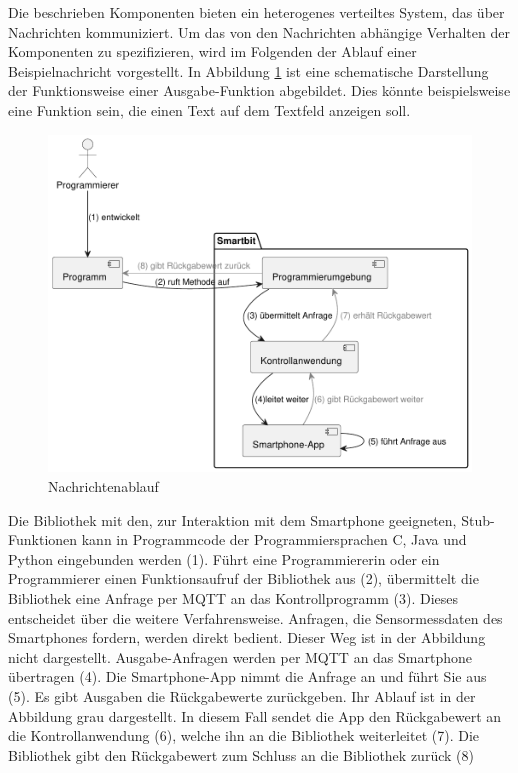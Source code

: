 \documentclass[11pt,a4paper]{report}
\begin{document}
Die beschrieben Komponenten bieten ein heterogenes verteiltes System, das über Nachrichten kommuniziert.
Um das von den Nachrichten abhängige Verhalten der Komponenten zu spezifizieren, wird im Folgenden der Ablauf einer Beispielnachricht vorgestellt.
In Abbildung \ref{fig:arch_flow} ist eine schematische Darstellung der Funktionsweise einer Ausgabe-Funktion abgebildet.
Dies könnte beispielsweise eine Funktion sein, die einen Text auf dem Textfeld anzeigen soll.
\begin{figure}[htbp]
  \centering
  \includegraphics[width=\textwidth]{images/arch_call_flow.pdf}
  \caption{Nachrichtenablauf}
  \label{fig:arch_flow}
\end{figure}
Die Bibliothek mit den, zur Interaktion mit dem Smartphone geeigneten, Stub-Funktionen kann in Programmcode der Programmiersprachen C, Java und Python eingebunden werden (1).
Führt eine Programmiererin oder ein Programmierer einen Funktionsaufruf der Bibliothek aus (2), übermittelt die Bibliothek eine Anfrage per MQTT an das Kontrollprogramm (3).
Dieses entscheidet über die weitere Verfahrensweise.
Anfragen, die Sensormessdaten des Smartphones fordern, werden direkt bedient.
Dieser Weg ist in der Abbildung nicht dargestellt.
Ausgabe-Anfragen werden per MQTT an das Smartphone übertragen (4).
Die Smartphone-App nimmt die Anfrage an und führt Sie aus (5).
Es gibt Ausgaben die Rückgabewerte zurückgeben.
Ihr Ablauf ist in der Abbildung grau dargestellt.
In diesem Fall sendet die App den Rückgabewert an die Kontrollanwendung (6), welche ihn an die Bibliothek weiterleitet (7).
Die Bibliothek gibt den Rückgabewert zum Schluss an die Bibliothek zurück (8)
\end{document}

